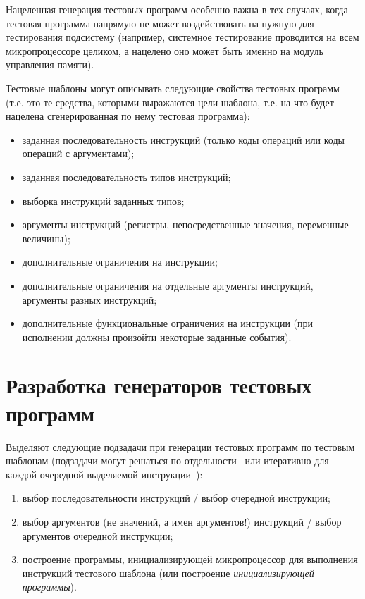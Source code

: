 Нацеленная генерация тестовых программ особенно важна в тех случаях,
когда тестовая программа напрямую не может воздействовать на нужную
для тестирования подсистему (например, системное тестирование
проводится на всем микропроцессоре целиком, а нацелено оно может
быть именно на модуль управления памяти).

Тестовые шаблоны могут описывать следующие свойства тестовых
программ (т.е. это те средства, которыми выражаются цели шаблона,
т.е. на что будет нацелена сгенерированная по нему тестовая
программа):
\begin{itemize}
\item заданная последовательность инструкций (только коды операций или
коды операций с аргументами);
\item заданная последовательность типов инструкций;
\item выборка инструкций заданных типов;
\item аргументы инструкций (регистры, непосредственные
значения, переменные величины);
\item дополнительные ограничения на инструкции;
\item дополнительные ограничения на отдельные аргументы инструкций,
аргументы разных инструкций;
\item дополнительные функциональные ограничения на инструкции (при
исполнении должны произойти некоторые заданные события).
\end{itemize}

\section{Разработка генераторов тестовых программ}

Выделяют следующие подзадачи при генерации тестовых программ по
тестовым шаблонам (подзадачи могут решаться по
отдельности~\cite{kamkin} или итеративно для каждой очередной
выделяемой инструкции~\cite{GenesysPro}):
\begin{enumerate}
  \item выбор последовательности инструкций / выбор очередной
  инструкции;
  \item выбор аргументов (не значений, а имен аргументов!) инструкций /
  выбор аргументов очередной инструкции;
  \item построение программы, инициализирующей микропроцессор для выполнения
  инструкций тестового шаблона (или построение \emph{инициализирующей программы}).
\end{enumerate}

